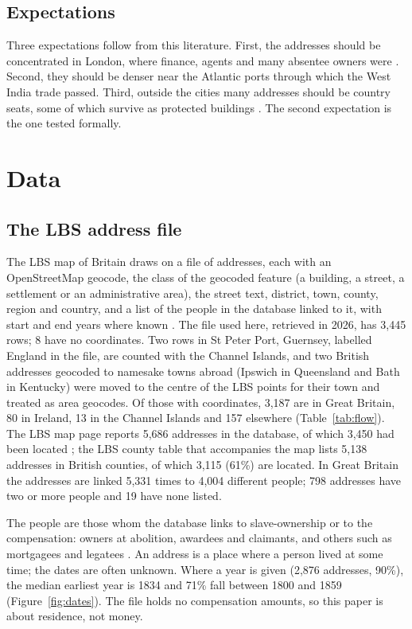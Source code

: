 \documentclass[11pt,a4paper]{article}
\begin{document}
\subsection{Expectations}
Three expectations follow from this literature. First, the addresses should be concentrated in London, where finance, agents and many absentee owners were \citep{draper2010}. Second, they should be denser near the Atlantic ports through which the West India trade passed. Third, outside the cities many addresses should be country seats, some of which survive as protected buildings \citep{dresser2013}. The second expectation is the one tested formally.

\section{Data}\label{sec:data}
\subsection{The LBS address file}
The LBS map of Britain draws on a file of addresses, each with an OpenStreetMap geocode, the class of the geocoded feature (a building, a street, a settlement or an administrative area), the street text, district, town, county, region and country, and a list of the people in the database linked to it, with start and end years where known \citep{lbs2026maps}. The file used here, retrieved in 2026, has 3,445 rows; 8 have no coordinates. Two rows in St Peter Port, Guernsey, labelled England in the file, are counted with the Channel Islands, and two British addresses geocoded to namesake towns abroad (Ipswich in Queensland and Bath in Kentucky) were moved to the centre of the LBS points for their town and treated as area geocodes. Of those with coordinates, 3,187 are in Great Britain, 80 in Ireland, 13 in the Channel Islands and 157 elsewhere (Table~\ref{tab:flow}). The LBS map page reports 5,686 addresses in the database, of which 3,450 had been located \citep{lbs2026maps}; the LBS county table that accompanies the map lists 5,138 addresses in British counties, of which 3,115 (61\%) are located. In Great Britain the addresses are linked 5,331 times to 4,004 different people; 798 addresses have two or more people and 19 have none listed.

The people are those whom the database links to slave-ownership or to the compensation: owners at abolition, awardees and claimants, and others such as mortgagees and legatees \citep{lbs2026details}. An address is a place where a person lived at some time; the dates are often unknown. Where a year is given (2,876 addresses, 90\%), the median earliest year is 1834 and 71\% fall between 1800 and 1859 (Figure~\ref{fig:dates}). The file holds no compensation amounts, so this paper is about residence, not money.
\end{document}
